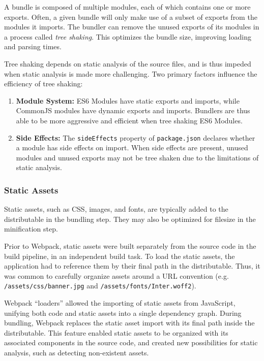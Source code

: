 \documentclass{article}
\begin{document}
A bundle is composed of multiple modules, each of which contains one or more exports. Often, a given
bundle will only make use of a subset of exports from the modules it imports. The bundler can remove
the unused exports of its modules in a process called \textit{tree shaking}. This optimizes the
bundle size, improving loading and parsing times.

Tree shaking depends on static analysis of the source files, and is thus impeded when static
analysis is made more challenging. Two primary factors influence the efficiency of tree shaking:

\begin{enumerate}
  \item \textbf{Module System:} ES6 Modules have static exports and imports, while CommonJS modules
    have dynamic exports and imports. Bundlers are thus able to be more aggressive and efficient
    when tree shaking ES6 Modules.

  \item \textbf{Side Effects:} The \texttt{sideEffects} property of \texttt{package.json} declares
    whether a module has side effects on import. When side effects are present, unused modules and
    unused exports may not be tree shaken due to the limitations of static analysis.
\end{enumerate}

\subsubsection{Static Assets}

Static assets, such as CSS, images, and fonts, are typically added to the distributable in the
bundling step. They may also be optimized for filesize in the minification step.

Prior to Webpack, static assets were built separately from the source code in the build pipeline, in
an independent build task. To load the static assets, the application had to reference them by their
final path in the distributable. Thus, it was common to carefully organize assets around a URL
convention (e.g. \texttt{/assets/css/banner.jpg} and \texttt{/assets/fonts/Inter.woff2}).

Webpack ``loaders'' allowed the importing of static assets from JavaScript, unifying both code and
static assets into a single dependency graph. During bundling, Webpack replaces the static asset
import with its final path inside the distributable. This feature enabled static assets to be
organized with its associated components in the source code, and created new possibilities for
static analysis, such as detecting non-existent assets.
\end{document}
